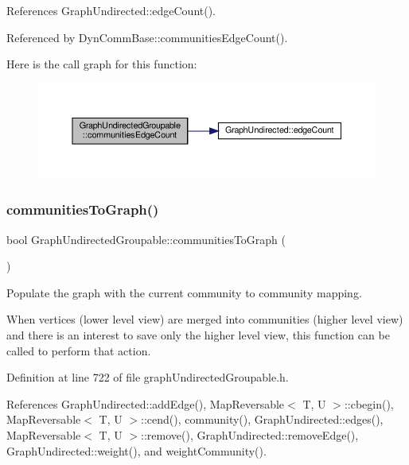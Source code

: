 References Graph\+Undirected\+::edge\+Count().



Referenced by Dyn\+Comm\+Base\+::communities\+Edge\+Count().

Here is the call graph for this function\+:
\nopagebreak
\begin{figure}[H]
\begin{center}
\leavevmode
\includegraphics[width=350pt]{classGraphUndirectedGroupable_a71de0c0e2157841bb1526c321277449a_cgraph}
\end{center}
\end{figure}
\mbox{\label{classGraphUndirectedGroupable_af6fc2c9e8aad7c6bce37d30eeaf184a8}} 
\subsubsection{\texorpdfstring{communities\+To\+Graph()}{communitiesToGraph()}}
{\footnotesize\ttfamily bool Graph\+Undirected\+Groupable\+::communities\+To\+Graph (\begin{DoxyParamCaption}{ }\end{DoxyParamCaption})\hspace{0.3cm}{\ttfamily [inline]}}



Populate the graph with the current community to community mapping. 

When vertices (lower level view) are merged into communities (higher level view) and there is an interest to save only the higher level view, this function can be called to perform that action.

Definition at line 722 of file graph\+Undirected\+Groupable.\+h.



References Graph\+Undirected\+::add\+Edge(), Map\+Reversable$<$ T, U $>$\+::cbegin(), Map\+Reversable$<$ T, U $>$\+::cend(), community(), Graph\+Undirected\+::edges(), Map\+Reversable$<$ T, U $>$\+::remove(), Graph\+Undirected\+::remove\+Edge(), Graph\+Undirected\+::weight(), and weight\+Community().



